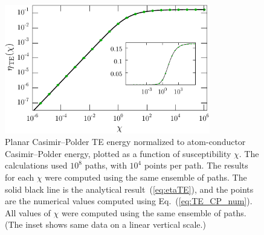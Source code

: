 \begin{figure}
  \centering
 \includegraphics[width=0.8\textwidth]{fig/temp/eff_TE_atom_wall}
  \caption[Planar Casimir--Polder TE energy as function of $\chi$]
  {Planar Casimir--Polder TE energy normalized to atom-conductor Casimir--Polder energy, plotted as a function of susceptibility $\chi$.  
    The calculations used $10^8$ paths, with $10^4$ points per path.
    The results for each $\chi$ were computed using the same ensemble of paths.
    The solid black line is the analytical result~(\ref{eq:etaTE}), and the points are the numerical
    values computed using Eq.~(\ref{eq:TE_CP_num}).  
    All values of $\chi$ were computed 
    using the same ensemble of paths.
    (The inset shows same data on a linear vertical scale.)
    }
  \label{fig:eff_TE_atom_wall}
\end{figure}



